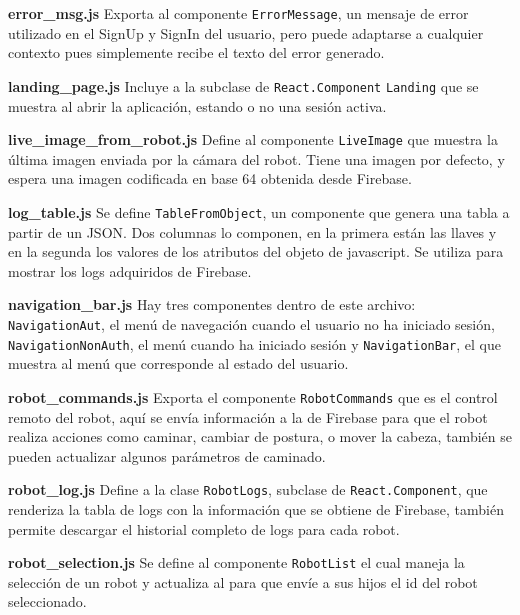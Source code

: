 \textbf{error\_msg.js}
\label{\detokenize{code_docs:error-msg-js}}
Exporta al componente \texttt{ErrorMessage}, un mensaje de error utilizado en el SignUp y SignIn del usuario, pero puede
adaptarse a cualquier contexto pues simplemente recibe el texto del error
generado.

\textbf{landing\_page.js}
\label{\detokenize{code_docs:landing-page-js}}
Incluye a la subclase de \texttt{React.Component} \texttt{Landing} que se muestra al abrir la aplicación, estando o no una sesión
activa.


\textbf{live\_image\_from\_robot.js}
\label{\detokenize{code_docs:live-image-from-robot-js}}
Define al componente \texttt{LiveImage} que muestra la última imagen enviada por la cámara del robot. Tiene una imagen por
defecto, y espera una imagen codificada en base 64 obtenida desde Firebase.


\textbf{log\_table.js}
\label{\detokenize{code_docs:log-table-js}}
Se define \texttt{TableFromObject}, un componente que genera una tabla a partir de un JSON. Dos columnas lo
componen, en la primera están las llaves y en la segunda los valores de los
atributos del objeto de javascript. Se utiliza para mostrar los logs adquiridos
de Firebase.

\textbf{navigation\_bar.js}
\label{\detokenize{code_docs:navigation-bar-js}}
Hay tres componentes dentro de este archivo:
\texttt{NavigationAut}, el menú de navegación cuando el
usuario no ha iniciado sesión,
\texttt{NavigationNonAuth}, el menú cuando ha iniciado sesión y
\texttt{NavigationBar}, 
el que muestra al menú que corresponde al estado del usuario.


\textbf{robot\_commands.js}
\label{\detokenize{code_docs:robot-commands-js}}
Exporta el componente \texttt{RobotCommands} que es el control remoto del robot, aquí se envía información a la
de Firebase para que el robot realiza acciones como caminar, cambiar de postura,
o mover la cabeza, también se pueden actualizar algunos parámetros de caminado.

\textbf{robot\_log.js}
\label{\detokenize{code_docs:robot-log-js}}
Define a la clase \texttt{RobotLogs}, subclase de \texttt{React.Component}, que renderiza la tabla de logs con la información que se obtiene de
Firebase, también permite descargar el historial completo de logs para cada
robot.


\textbf{robot\_selection.js}
\label{\detokenize{code_docs:robot-selection-js}}
Se define al componente \texttt{RobotList} el cual maneja la selección de un robot y actualiza al
 para que envíe a sus hijos el id del robot seleccionado.

